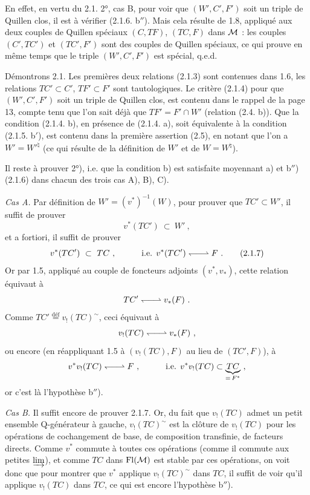 
En effet, en vertu du 2.1. 2°, cas B, pour voir que $(W',C',F')$ soit un triple de Quillen clos, il est à vérifier (2.1.6. b$''$). Mais cela résulte de 1.8, appliqué aux deux couples de Quillen spéciaux $(C,TF)$, $(TC,F)$ dans $\mathcal{M}$ : les couples $(C',TC')$ et $(TC',F')$ sont des couples de Quillen spéciaux, ce qui prouve en même temps que le triple $(W',C',F')$ est spécial, q.e.d. %

Démontrons 2.1. Les premières deux relations (2.1.3) sont contenues dans 1.6, les relations $TC' \subset C'$, $TF' \subset F'$ sont tautologiques. Le critère (2.1.4) pour que $(W',C',F')$ soit un triple de Quillen clos, est contenu dans le rappel de la page 13, compte tenu que l'on sait déjà que $TF' = F' \cap W'$ (relation (2.4. b)). Que la condition (2.1.4. b), en présence de (2.1.4. a), soit équivalente à la condition (2.1.5. b$'$), est contenu dans la première assertion (2.5), en notant que l'on a $W' = W'^{\natural}$ (ce qui résulte de la définition de $W'$ et de $W = W^{\natural}$).

Il reste à prouver 2°), i.e. que la condition b) est satisfaite moyennant a) et b$''$) (2.1.6) dans chacun des trois cas A), B), C).

\textit{Cas A.} Par définition de $W' = (v^*)^{-1}(W)$, pour prouver que $TC' \subset W'$, il suffit de prouver
\[
v^*(TC')\ \subset\ W'\ ,  %
\]
et a fortiori, il suffit de prouver
\[
v^*(TC')\ \subset\ TC\ ,\qquad\quad \text{i.e. } v^*(TC') \harp F\ .
\tag*{(2.1.7)} %
\]
Or par 1.5, appliqué au couple de foncteurs
adjoints $(v^*,v_*)$, cette relation équivaut à
\[
TC' \harp v_*(F)\ .
\]
Comme $TC' \overset{\text{déf}}{=} v_!(TC)^{\sim}$, ceci équivaut à
\[
v_!(TC) \harp v_*(F)\ ,
\]
ou encore (en réappliquant 1.5 à $(v_!(TC),F)$ au lieu de $(TC',F)$), à
\[
v^*v_!(TC) \harp F\ ,\qquad\quad \text{i.e. } v^*v_!(TC) \subset \underbrace{TC}_{=\,F^*}\ ,
\]
or c'est là l'hypothèse b$''$).

\textit{Cas B.} Il suffit encore de prouver 2.1.7. Or, du fait que $v_!(TC)$ admet un petit ensemble Q-générateur à gauche, $v_!(TC)^{\sim}$ est la clôture de $v_!(TC)$ pour les opérations de cochangement de base, de composition transfinie, de facteurs directs. Comme $v^*$ commute à toutes ces opérations (comme il commute aux petites $\varinjlim$), et comme $TC$ dans $\mathrm{Fl}(\mathcal{M})$ est stable par ces opérations, on voit donc que pour montrer que $v^*$ applique $v_!(TC)^{\sim}$ dans $TC$, il suffit de voir qu'il applique $v_!(TC)$ dans $TC$, ce qui est encore l'hypothèse b$''$).

